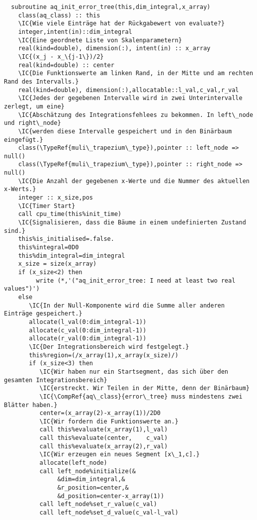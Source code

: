 \begin{Verbatim}
  subroutine aq_init_error_tree(this,dim_integral,x_array)
    class(aq_class) :: this
    \IC{Wie viele Einträge hat der Rückgabewert von evaluate?}
    integer,intent(in)::dim_integral
    \IC{Eine geordnete Liste von Skalenparametern}
    real(kind=double), dimension(:), intent(in) :: x_array
    \IC{(x_j - x_\{j-1\})/2}
    real(kind=double) :: center
    \IC{Die Funktionswerte am linken Rand, in der Mitte und am rechten Rand des Intervalls.}
    real(kind=double), dimension(:),allocatable::l_val,c_val,r_val
    \IC{Jedes der gegebenen Intervalle wird in zwei Unterintervalle zerlegt, um eine}
    \IC{Abschätzung des Integrationsfehlees zu bekommen. In left\_node und right\_node}
    \IC{werden diese Intervalle gespeichert und in den Binärbaum eingefügt.}
    class(\TypeRef{muli\_trapezium\_type}),pointer :: left_node => null()
    class(\TypeRef{muli\_trapezium\_type}),pointer :: right_node => null()
    \IC{Die Anzahl der gegebenen x-Werte und die Nummer des aktuellen x-Werts.}
    integer :: x_size,pos
    \IC{Timer Start}
    call cpu_time(this%init_time)
    \IC{Signalisieren, dass die Bäume in einem undefinierten Zustand sind.}
    this%is_initialised=.false.
    this%integral=0D0
    this%dim_integral=dim_integral
    x_size = size(x_array)
    if (x_size<2) then
         write (*,'("aq_init_error_tree: I need at least two real values")')
    else
       \IC{In der Null-Komponente wird die Summe aller anderen Einträge gespeichert.}
       allocate(l_val(0:dim_integral-1))
       allocate(c_val(0:dim_integral-1))
       allocate(r_val(0:dim_integral-1))
       \IC{Der Integrationsbereich wird festgelegt.}
       this%region=(/x_array(1),x_array(x_size)/)
       if (x_size<3) then
          \IC{Wir haben nur ein Startsegment, das sich über den gesamten Integrationsbereich}
          \IC{erstreckt. Wir Teilen in der Mitte, denn der Binärbaum}
          \IC{\CompRef{aq\_class}{error\_tree} muss mindestens zwei Blätter haben.}
          center=(x_array(2)-x_array(1))/2D0
          \IC{Wir fordern die Funktionswerte an.}
          call this%evaluate(x_array(1),l_val)
          call this%evaluate(center,    c_val)
          call this%evaluate(x_array(2),r_val)
          \IC{Wir erzeugen ein neues Segment [x\_1,c].}
          allocate(left_node)
          call left_node%initialize(&
               &dim=dim_integral,&
               &r_position=center,&
               &d_position=center-x_array(1))
          call left_node%set_r_value(c_val)
          call left_node%set_d_value(c_val-l_val)

\end{Verbatim}
